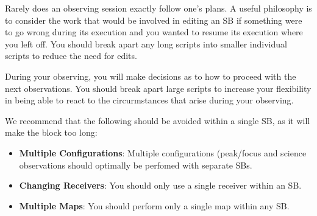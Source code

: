 Rarely does an observing session exactly follow one's plans.  A useful
philosophy is to consider the work that would be involved in editing
an \gls{SB} if something were to go wrong during its execution
and you wanted to resume its execution where you left off.
You should break apart any long scripts into smaller individual scripts
to reduce the need for edits.  

During your observing, you will make decisions as to how to proceed
with the next observations.  You should break apart large scripts to increase
your flexibility in being able to react to the circurmstances that
arise during your observing.

We recommend that the following should be avoided within a single \gls{SB}, as
it will make the block too long:
\begin{itemize}
\item {\bf Multiple Configurations}: Multiple configurations (peak/focus and
science observations should optimally be perfomed with separate \glspl{SB}.
\item {\bf Changing Receivers}: You should only use a single receiver within
an \gls{SB}.
\item {\bf Multiple Maps}: You should perform only a single map within any
\gls{SB}.
\end{itemize}














